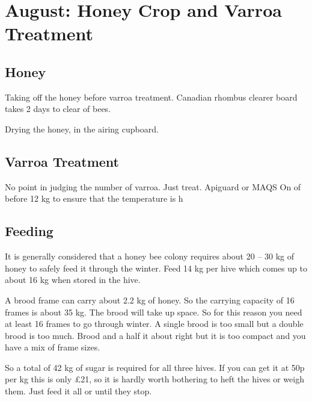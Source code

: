 \section{August: Honey Crop and Varroa Treatment}

\subsection{Honey}

Taking off the honey before varroa treatment.
Canadian rhombus clearer board takes 2 days to clear of bees.

Drying the honey,
in the airing cupboard.

\subsection{Varroa Treatment}

No point in judging the number of varroa.
Just treat.
Apiguard or MAQS
On of before 12 kg to ensure that the temperature is h

\subsection{Feeding}

 It is
generally considered that a honey bee colony requires about 20 – 30 kg of honey to
safely feed it through the winter. 
Feed 14 kg per hive
which comes up to about 16 kg when stored in the hive.

A brood frame can carry about 2.2 kg of honey.  
So the carrying capacity of 16 frames is about 35 kg.
The brood will take up space.
So for this reason you need at least 16 frames to go through winter.
A single brood is too small but a double brood is too much.
Brood and a half it about right but it is too compact
and you have a mix of frame sizes.

 So a total of 42 kg of sugar is required for all three hives.
 If you can get it at 50p per kg this is only £21,
 so it is hardly worth bothering to heft the hives or weigh them.
 Just feed it all or until they stop.
 

